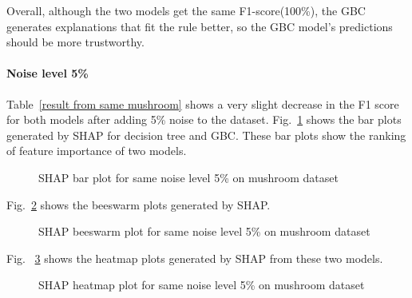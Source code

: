 \documentclass[runningheads,a4paper]{llncs}
\begin{document}
Overall, although the two models get the same F1-score(100\%), the GBC generates explanations that fit the rule better, so the GBC model's predictions should be more trustworthy.
\paragraph{Noise level 5\%}
Table~\ref{result from same mushroom} shows a very slight decrease in the F1 score for both models after adding 5\% noise to the dataset.
Fig.~\ref{bar plots noise level 5} shows the bar plots generated by SHAP for decision tree and GBC. These bar plots show the ranking of feature importance of two models.
\begin{figure}[H]
	\centering
	
	\hfill
	
	
	\caption{SHAP bar plot for same noise level 5\% on mushroom dataset}
	\label{bar plots noise level 5}
\end{figure}

Fig.~\ref{bee plots noise level 5} shows the beeswarm plots generated by SHAP.
\begin{figure}[H]
	\centering
	
	\hfill
	
	
	\caption{SHAP beeswarm plot for same noise level 5\% on mushroom dataset}
	\label{bee plots noise level 5}
	
\end{figure}
Fig. ~\ref{heat plots noise level 5} shows the heatmap plots generated by SHAP from these two models.
\begin{figure}[H]
	\centering
	
	\hfill
	
	
	\caption{SHAP heatmap plot for same noise level 5\% on mushroom dataset}
	\label{heat plots noise level 5}
	
\end{figure}
\end{document}
